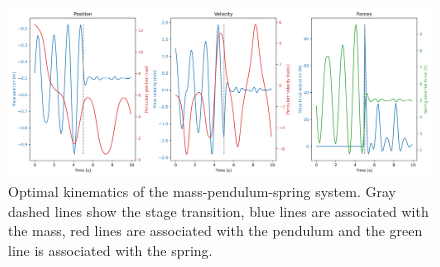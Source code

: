 \begin{figure}[t!]
\centering
\includegraphics[width=\textwidth]{figures/Mass_Pendulum_Fext.png}
\caption{Optimal kinematics of the mass-pendulum-spring system. Gray dashed lines show the stage transition, blue lines are associated with the mass, red lines are associated with the pendulum and the green line is associated with the spring.}
\label{fig:Mass_Pendulum_Fext_graphs}
\end{figure}














